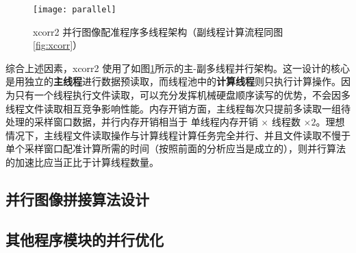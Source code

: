 \begin{figure}[ht]
\centering
\texttt{[image: parallel]}
\caption{xcorr2 并行图像配准程序多线程架构（副线程计算流程同图\ref{fig:xcorr}）} \label{fig:parallel}
\end{figure}

综合上述因素，xcorr2 使用了如图\ref{fig:parallel}所示的主-副多线程并行架构。这一设计的核心是用独立的\textbf{主线程}进行数据预读取，而线程池中的\textbf{计算线程}则只执行计算操作。因为只有一个线程执行文件读取，可以充分发挥机械硬盘顺序读写的优势，不会因多线程文件读取相互竞争影响性能。内存开销方面，主线程每次只提前多读取一组待处理的采样窗口数据，并行内存开销相当于 单线程内存开销 $\times$ 线程数 $\times 2$。理想情况下，主线程文件读取操作与计算线程计算任务完全并行、并且文件读取不慢于单个采样窗口配准计算所需的时间（按照前面的分析应当是成立的），则并行算法的加速比应当正比于计算线程数量。


\subsection{并行图像拼接算法设计}

\subsection{其他程序模块的并行优化}
